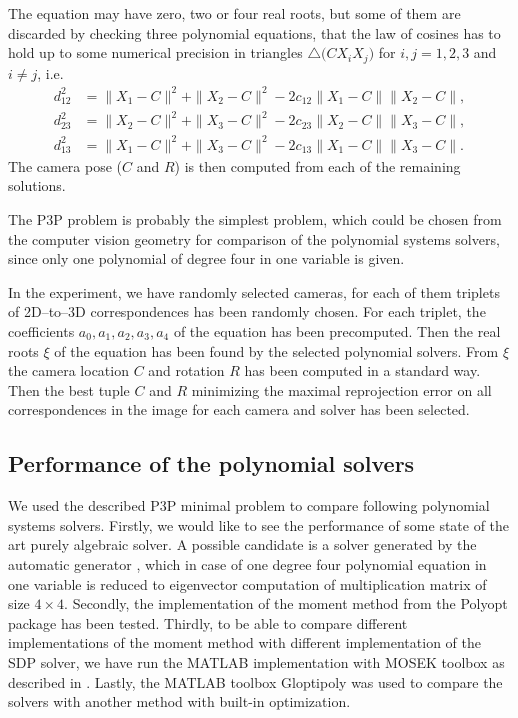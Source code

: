 The equation  may have zero, two or four real roots, but some of them are discarded by checking three polynomial equations, that the law of cosines has to hold up to some numerical precision in triangles $\triangle\big(CX_iX_j\big)$ for $i,j=1,2,3$ and $i\neq j$, i.e.
\begin{align}
  d_{12}^2 &= \|X_1-C\|^2 + \|X_2-C\|^2 - 2c_{12}\|X_1-C\|\|X_2-C\|,\\
  d_{23}^2 &= \|X_2-C\|^2 + \|X_3-C\|^2 - 2c_{23}\|X_2-C\|\|X_3-C\|,\\
  d_{13}^2 &= \|X_1-C\|^2 + \|X_3-C\|^2 - 2c_{13}\|X_1-C\|\|X_3-C\|.
\end{align}
The camera pose ($C$ and $R$) is then computed from each of the remaining solutions.

The P3P problem is probably the simplest problem, which could be chosen from the computer vision geometry for comparison of the polynomial systems solvers, since only one polynomial of degree four in one variable is given.


In the experiment, we have randomly selected \importAppPPPNumCameras{} cameras, for each of them \importAppPPPNumPoints{} triplets of 2D--to--3D correspondences has been randomly chosen.
For each triplet, the coefficients $a_0, a_1, a_2, a_3, a_4$ of the equation  has been precomputed.
Then the real roots $\xi$  of the equation  has been found by the selected polynomial solvers.
From $\xi$ the camera location $C$ and rotation $R$ has been computed in a standard way.
Then the best tuple $C$ and $R$ minimizing the maximal reprojection error on all correspondences in the image for each camera and solver has been selected.

\subsection{Performance of the polynomial solvers}
We used the described P3P minimal problem to compare following polynomial systems solvers.
Firstly, we would like to see the performance of some state of the art purely algebraic solver.
A possible candidate is a solver generated by the automatic generator \cite{autogen}, which in case of one degree four polynomial equation in one variable is reduced to eigenvector computation of multiplication matrix of size $4\times4$.
Secondly, the implementation of the moment method from the Polyopt package has been tested.
Thirdly, to be able to compare different implementations of the moment method with different implementation of the SDP solver, we have run the MATLAB implementation with MOSEK toolbox as described in .
Lastly, the MATLAB toolbox Gloptipoly \cite{gloptipoly} was used to compare the solvers with another method with built-in optimization.

